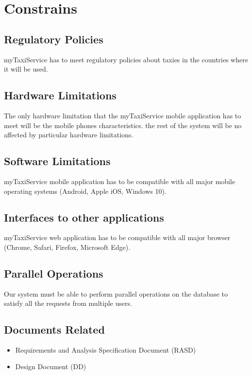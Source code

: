 \documentclass{report}
\begin{document}
	\section{Constrains}
		
		\subsection{Regulatory Policies}
		myTaxiService  has to meet regulatory policies about taxies in the countries where it will be used.

		\subsection{Hardware Limitations}
		The only hardware limitation that the myTaxiService mobile application has to meet will be the mobile phones characteristics. the rest of the system will be no affected by particular hardware limitations.

		\subsection{Software Limitations}
		myTaxiService mobile application has to be compatible with all major mobile operating systems (Android, Apple iOS, Windows 10).

		\subsection{Interfaces to other applications}
		myTaxiService web application has to be compatible with all major browser (Chrome, Safari, Firefox, Microsoft Edge).

		\subsection{Parallel Operations}
		Our system must be able to perform parallel operations on the database to satisfy all the requests from multiple users.

		\subsection{Documents Related}

			\begin{itemize}
				\item Requirements and Analysis Specification Document (RASD)

				\item Design Document (DD)
			\end{itemize}
\end{document}

